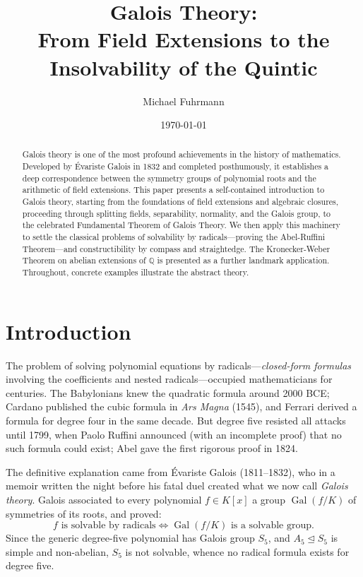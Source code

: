 \documentclass[12pt,a4paper]{amsart}
\title{Galois Theory:\\
       From Field Extensions to the Insolvability of the Quintic}
\author{Michael Fuhrmann}
\date{\today}
\theoremstyle{definition}
\newcommand{\Q}{\mathbb{Q}}
\newcommand{\Gal}{\operatorname{Gal}}
\begin{document}

\begin{abstract}
Galois theory is one of the most profound achievements in the history of
mathematics. Developed by \'{E}variste Galois in 1832 and completed
posthumously, it establishes a deep correspondence between the symmetry groups
of polynomial roots and the arithmetic of field extensions. This paper presents
a self-contained introduction to Galois theory, starting from the foundations
of field extensions and algebraic closures, proceeding through splitting fields,
separability, normality, and the Galois group, to the celebrated Fundamental
Theorem of Galois Theory. We then apply this machinery to settle the classical
problems of solvability by radicals—proving the Abel-Ruffini Theorem—and
constructibility by compass and straightedge. The Kronecker-Weber Theorem on
abelian extensions of $\Q$ is presented as a further landmark application.
Throughout, concrete examples illustrate the abstract theory.
\end{abstract}

\maketitle
\tableofcontents

\section{Introduction}

The problem of solving polynomial equations by radicals—\emph{closed-form
formulas} involving the coefficients and nested radicals—occupied mathematicians
for centuries. The Babylonians knew the quadratic formula around 2000 BCE;
Cardano published the cubic formula in \emph{Ars Magna} (1545), and Ferrari
derived a formula for degree four in the same decade. But degree five resisted
all attacks until 1799, when Paolo Ruffini announced (with an incomplete proof)
that no such formula could exist; Abel gave the first rigorous proof in 1824.

The definitive explanation came from \'{E}variste Galois (1811--1832), who in
a memoir written the night before his fatal duel created what we now call
\emph{Galois theory}. Galois associated to every polynomial $f \in K[x]$ a
group $\Gal(f/K)$ of symmetries of its roots, and proved:
\[
  f \text{ is solvable by radicals} \iff \Gal(f/K) \text{ is a solvable group.}
\]
Since the generic degree-five polynomial has Galois group $S_5$, and $A_5
\trianglelefteq S_5$ is simple and non-abelian, $S_5$ is not solvable, whence
no radical formula exists for degree five.
\end{document}
